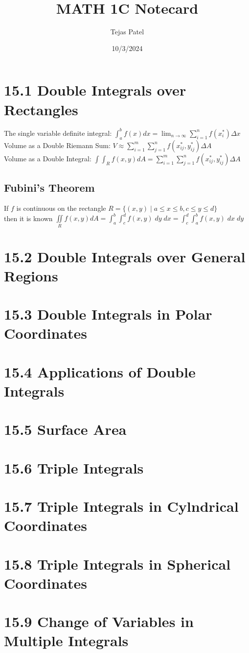 \documentclass{article}
\title{MATH 1C Notecard}
\date{10/3/2024}
\author{Tejas Patel}
\begin{document}
\maketitle
\section*{15.1 Double Integrals over Rectangles}
The single variable definite integral: $\int_{a}^{b} f(x) dx = \lim_{n\to\infty} \sum_{i=1}^{n} f(x^*_i) \Delta x$
\\ Volume as a Double Riemann Sum: $V \approx \sum_{i=1}^{m}\sum_{j=1}^{n} f(x^*_{ij}, y^*_{ij}) \Delta A$
\\ Volume as a Double Integral: $\int\int_{R}f(x,y) dA = \sum_{i=1}^{m}\sum_{j=1}^{n} f(x^*_{ij}, y^*_{ij}) \Delta A$
\subsection*{Fubini's Theorem}
If $f$ is continuous on the rectangle $R=\{(x,y) \; | \; a \leq x \leq b,c\leq y \leq d\}$
\\[0.1in]then it is known $\iint\limits_{R} f(x,y)dA = \int_{a}^{b}\int_{c}^{d}f(x,y)\; dy \; dx = \int_{c}^{d}\int_{a}^{b} f(x,y) \; dx \; dy$
\section*{15.2 Double Integrals over General Regions}
\section*{15.3 Double Integrals in Polar Coordinates}
\section*{15.4 Applications of Double Integrals}
\section*{15.5 Surface Area}
\section*{15.6 Triple Integrals}
\section*{15.7 Triple Integrals in Cylndrical Coordinates}
\section*{15.8 Triple Integrals in Spherical Coordinates}
\section*{15.9 Change of Variables in Multiple Integrals}
\end{document}
